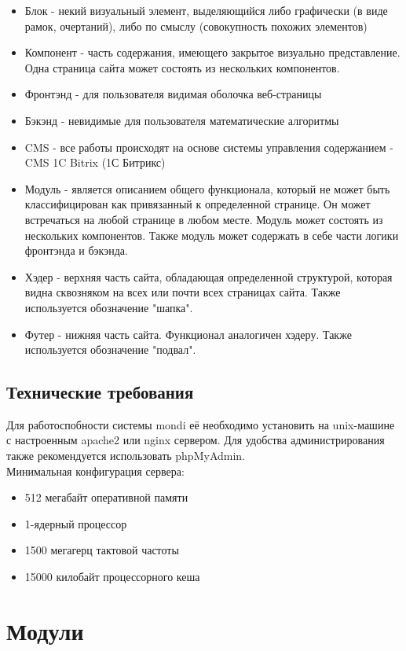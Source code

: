 \documentclass[DIV=calc, paper=a4, fontsize=11pt]{scrartcl} %
\begin{document}
        \begin{itemize}
        \item Блок - некий визуальный элемент, выделяющийся либо графически (в виде рамок, очертаний), либо по смыслу (совокупность похожих элементов)
        \item Компонент - часть содержания, имеющего закрытое визуально представление. Одна страница сайта может состоять из нескольких компонентов.
        \item Фронтэнд - для пользователя видимая оболочка веб-страницы
        \item Бэкэнд - невидимые для пользователя математические алгоритмы
        \item CMS - все работы происходят на основе системы управления содержанием - CMS 1C Bitrix (1С Битрикс)
        \item Модуль - является описанием общего функционала, который не может быть классифицирован как привязанный к определенной странице. Он может встречаться на любой странице в любом месте. Модуль может состоять из нескольких компонентов. Также модуль может содержать в себе части логики фронтэнда и бэкэнда.
        \item Хэдер - верхняя часть сайта, обладающая определенной структурой, которая видна сквозняком на всех или почти всех страницах сайта. Также используется обозначение "шапка".
        \item Футер - нижняя часть сайта. Функционал аналогичен хэдеру. Также используется обозначение "подвал".
    \end{itemize}
    
\subsection{Технические требования}
Для работоспобности системы mondi её необходимо установить на unix-машине с настроенным apache2 или nginx сервером.
Для удобства администрирования также рекомендуется использовать phpMyAdmin.
\\[0.5cm]
Минимальная конфигурация сервера:
\begin{itemize}
	\item 512 мегабайт оперативной памяти
	\item 1-ядерный процессор
	\item 1500 мегагерц тактовой частоты
	\item 15000 килобайт процессорного кеша
\end{itemize}


\section{Модули}
\end{document}
